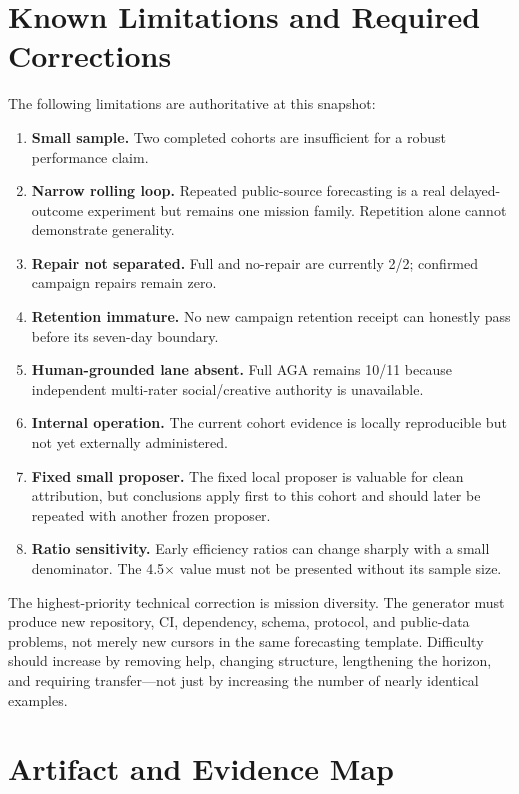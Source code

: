 \documentclass[11pt,a4paper]{article}
\begin{document}
\section{Known Limitations and Required Corrections}
\label{sec:limitations}

The following limitations are authoritative at this snapshot:
\begin{enumerate}
    \item \textbf{Small sample.}  Two completed cohorts are insufficient for a
          robust performance claim.
    \item \textbf{Narrow rolling loop.}  Repeated public-source forecasting is
          a real delayed-outcome experiment but remains one mission family.
          Repetition alone cannot demonstrate generality.
    \item \textbf{Repair not separated.}  Full and no-repair are currently 2/2;
          confirmed campaign repairs remain zero.
    \item \textbf{Retention immature.}  No new campaign retention receipt can
          honestly pass before its seven-day boundary.
    \item \textbf{Human-grounded lane absent.}  Full AGA remains 10/11 because
          independent multi-rater social/creative authority is unavailable.
    \item \textbf{Internal operation.}  The current cohort evidence is locally
          reproducible but not yet externally administered.
    \item \textbf{Fixed small proposer.}  The fixed local proposer is valuable
          for clean attribution, but conclusions apply first to this cohort and
          should later be repeated with another frozen proposer.
    \item \textbf{Ratio sensitivity.}  Early efficiency ratios can change
          sharply with a small denominator.  The 4.5$\times$ value must not be
          presented without its sample size.
\end{enumerate}

The highest-priority technical correction is mission diversity.  The generator
must produce new repository, CI, dependency, schema, protocol, and public-data
problems, not merely new cursors in the same forecasting template.  Difficulty
should increase by removing help, changing structure, lengthening the horizon,
and requiring transfer---not just by increasing the number of nearly identical
examples.

\section{Artifact and Evidence Map}
\label{sec:artifacts}
\end{document}
